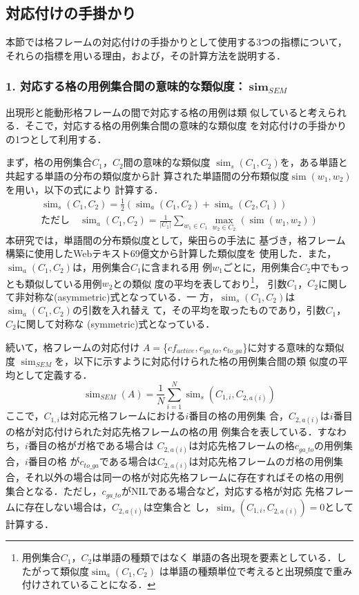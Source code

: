 \documentclass[japanese]{jnlp_1.4}
\begin{document}
  \subsection{対応付けの手掛かり}

  本節では格フレームの対応付けの手掛かりとして使用する3つの指標について，
  それらの指標を用いる理由，および，その計算方法を説明する．
  

  \subsubsection*{1. 対応する格の用例集合間の意味的な類似度：$\boldsymbol{\operatorname{sim}_\mathit{SEM}}$}

出現形と能動形格フレームの間で対応する格の用例は類
   似していると考えられる．そこで，対応する格の用例集合間の意味的な類似度
   を対応付けの手掛かりの1つとして利用する．

   まず，格の用例集合$C_1$，$C_2$間の意味的な類似度
   $\operatorname{sim}_s(C_1,C_2)$を，ある単語と共起する単語の分布の類似度から計
   算された単語間の分布類似度$\operatorname{sim}(w_1, w_2)$を用い，以下の式により
   計算する．
   \begin{gather*}
    \operatorname{sim}_s(C_1,C_2)=\frac{1}{2}(\operatorname{sim}_a(C_1,C_2)+
	\operatorname{sim}_a(C_2,C_1)) \\
    \text{ただし}\quad \operatorname{sim}_a(C_1, C_2)
	=\frac{1}{|C_1|}\sum_{w_1\in {C}_1} \max_{w_2\in C_2}(\operatorname{sim}(w_1, w_2))
   \end{gather*}
   本研究では，単語間の分布類似度として，柴田らの手法\cite{Shibata2009}に
   基づき，格フレーム構築に使用したWebテキスト69億文から計算した類似度を
   使用した．また，$\operatorname{sim}_a(C_1, C_2)$は，用例集合$C_1$に含まれる用
   例$w_1$ごとに，用例集合$C_2$中でもっとも類似している用例$w_2$との類似
   度の平均を表しており\footnote{用例集合$C_1$，$C_2$は単語の種類ではなく
   単語の各出現を要素としている．したがって類似度$\operatorname{sim}_a(C_1,C_2)$
   は単語の種類単位で考えると出現頻度で重み付けされていることになる．}，
   引数$C_1$，$C_2$に関して非対称な(asymmetric)式となっている．一
   方，$\operatorname{sim}_s(C_1,C_2)$は$\operatorname{sim}_a(C_1,C_2)$の引数を入れ替え
   て，その平均を取ったものであり，引数$C_1$，$C_2$に関して対称な
   (symmetric)式となっている．

   続いて，格フレームの対応付け
   $A=$\{$cf_{active},c_{ga\_to},c_{to\_ga}$\}に対する意味的な類似度
   $\operatorname{sim}_{SEM}$を，以下に示すように対応付けられた格の用例集合間の類
   似度の平均として定義する．
   \[
     \operatorname{sim}_{SEM}(A)= \frac{1}{N}\sum_{i=1}^{N}\operatorname{sim}_s(C_{1,i},C_{2,a(i)})
   \]
   ここで，$C_{1,i}$は対応元格フレームにおける$i$番目の格の用例集
   合，$C_{2,a(i)}$は$i$番目の格が対応付けられた対応先格フレームの格の用
   例集合を表している．すなわち，$i$番目の格がガ格である場合は
   $C_{2,a(i)}$は対応先格フレームの格$c_{ga\_to}$の用例集合，$i$番目の格
   が$c_{to\_ga}$である場合は$C_{2,a(i)}$は対応先格フレームのガ格の用例集
   合，それ以外の場合は同一の格が対応先格フレームに存在すればその格の用例
   集合となる．ただし，$c_{ga\_to}$がNILである場合など，対応する格が対応
   先格フレームに存在しない場合は，$C_{2,a(i)}$は空集合と
   し，$\operatorname{sim}_s(C_{1,i},C_{2,a(i)})=0$として計算する．
\end{document}
